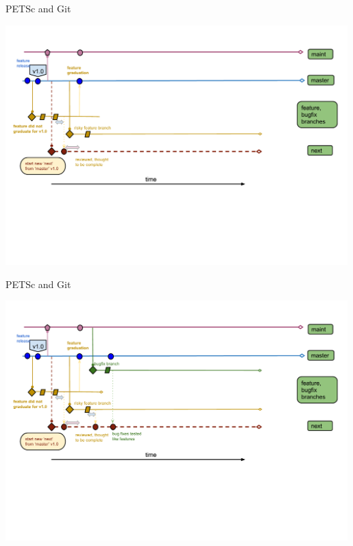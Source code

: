 \begin{frame}{PETSc and Git}
  \begin{center}
    \includegraphics[width=0.99\textwidth]{figures/gitworkflows-65}
  \end{center}
\end{frame}

\begin{frame}{PETSc and Git}
  \begin{center}
    \includegraphics[width=0.99\textwidth]{figures/gitworkflows-70}
  \end{center}
\end{frame}

